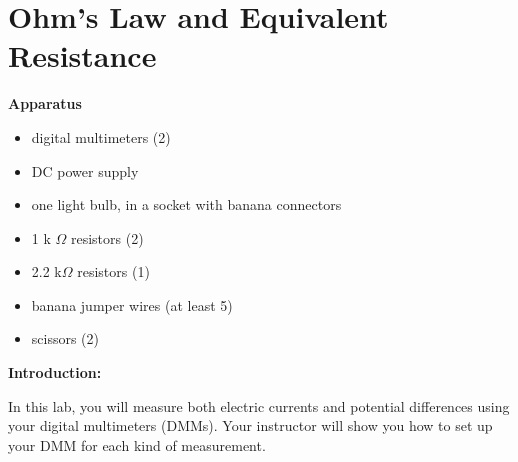 
\section{Ohm's Law and Equivalent Resistance}

\makelabheader %

\textbf{Apparatus}
\begin{itemize}
\item digital multimeters (2)
\item DC power supply 
\item one light bulb, in a socket with banana connectors
\item 1 k $\Omega$ resistors (2)
\item 2.2 k$\Omega$ resistors (1)
\item banana jumper wires (at least 5)
\item scissors (2)
\end{itemize}

\textbf{Introduction:}

In this lab, you will measure both electric currents and potential differences using your digital multimeters (DMMs).  Your instructor will show you how to set up your DMM for each kind of measurement.

